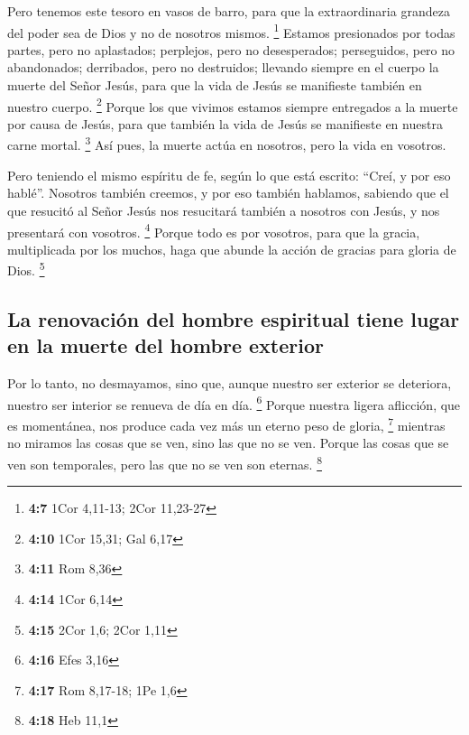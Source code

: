 \begin{paracol}{2}
 Pero tenemos este tesoro en vasos de barro, para que la
extraordinaria grandeza del poder sea de Dios y no de nosotros mismos.
\footnote{\textbf{4:7} 1Cor 4,11-13; 2Cor 11,23-27} 
Estamos presionados por todas partes, pero no aplastados; perplejos,
pero no desesperados;  perseguidos, pero no abandonados;
derribados, pero no destruidos;  llevando siempre en el
cuerpo la muerte del Señor Jesús, para que la vida de Jesús se
manifieste también en nuestro cuerpo. \footnote{\textbf{4:10} 1Cor
  15,31; Gal 6,17}  Porque los que vivimos estamos
siempre entregados a la muerte por causa de Jesús, para que también la
vida de Jesús se manifieste en nuestra carne mortal. \footnote{\textbf{4:11}
  Rom 8,36}  Así pues, la muerte actúa en nosotros, pero
la vida en vosotros.

 Pero teniendo el mismo espíritu de fe, según lo que está
escrito: ``Creí, y por eso hablé''. Nosotros también creemos, y por eso
también hablamos,  sabiendo que el que resucitó al Señor
Jesús nos resucitará también a nosotros con Jesús, y nos presentará con
vosotros. \footnote{\textbf{4:14} 1Cor 6,14}  Porque todo
es por vosotros, para que la gracia, multiplicada por los muchos, haga
que abunde la acción de gracias para gloria de Dios. \footnote{\textbf{4:15}
  2Cor 1,6; 2Cor 1,11}

\hypertarget{la-renovaciuxf3n-del-hombre-espiritual-tiene-lugar-en-la-muerte-del-hombre-exterior}{%
\subsection{La renovación del hombre espiritual tiene lugar en la muerte
del hombre
exterior}\label{la-renovaciuxf3n-del-hombre-espiritual-tiene-lugar-en-la-muerte-del-hombre-exterior}}

 Por lo tanto, no desmayamos, sino que, aunque nuestro
ser exterior se deteriora, nuestro ser interior se renueva de día en
día. \footnote{\textbf{4:16} Efes 3,16}  Porque nuestra
ligera aflicción, que es momentánea, nos produce cada vez más un eterno
peso de gloria, \footnote{\textbf{4:17} Rom 8,17-18; 1Pe 1,6}
 mientras no miramos las cosas que se ven, sino las que
no se ven. Porque las cosas que se ven son temporales, pero las que no
se ven son eternas. \footnote{\textbf{4:18} Heb 11,1}

\switchcolumn
\begin{otherlanguage}{english}


\end{otherlanguage}
\end{paracol}
